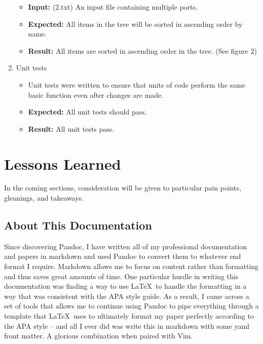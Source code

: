 \documentclass[english,floatsintext,man]{apa6}
\providecommand{\tightlist}{%
  \setlength{\itemsep}{0pt}\setlength{\parskip}{0pt}}
\begin{document}
\begin{enumerate}
  \begin{itemize}
  \tightlist
  \item
    \textbf{Input:} (2.txt) An input file containing multiple ports.
  \item
    \textbf{Expected:} All items in the tree will be sorted in ascending
    order by name.
  \item
    \textbf{Result:} All items are sorted in ascending order in the
    tree. (See figure 2)
  \end{itemize}
\item
  Unit tests

  \begin{itemize}
  \tightlist
  \item
    Unit tests were written to ensure that units of code perform the
    same basic function even after changes are made.
  \item
    \textbf{Expected:} All unit tests should pass.
  \item
    \textbf{Result:} All unit tests pass.
  \end{itemize}
\end{enumerate}

\section{Lessons Learned}\label{lessons-learned}

In the coming sections, consideration will be given to particular pain
points, gleanings, and takeaways.

\subsection{About This Documentation}\label{about-this-documentation}

Since discovering Pandoc, I have written all of my professional
documentation and papers in markdown and used Pandoc to convert them to
whatever end format I require. Markdown allows me to focus on content
rather than formatting and thus saves great amounts of time. One
particular hurdle in writing this documentation was finding a way to use
\LaTeX~to handle the formatting in a way that was consistent with the
APA style guide. As a result, I came across a set of tools that allows
me to continue using Pandoc to pipe everything through a template that
\LaTeX~uses to ultimately format my paper perfectly according to the APA
style -- and all I ever did was write this in markdown with some yaml
front matter. A glorious combination when paired with Vim.
\end{document}
